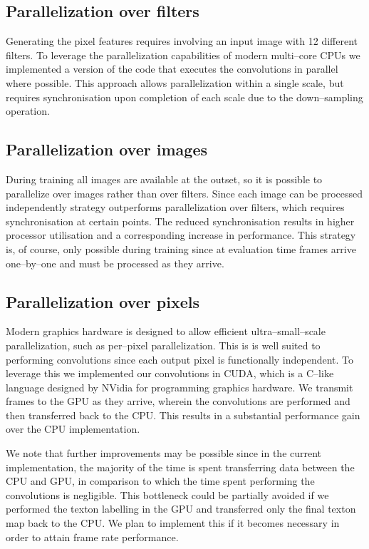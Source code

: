 \subsection{Parallelization over filters}
Generating the pixel features requires involving an input image with
12 different filters. To leverage the parallelization capabilities of
modern multi--core CPUs we implemented a version of the code that
executes the convolutions in parallel where possible. This approach
allows parallelization within a single scale, but requires
synchronisation upon completion of each scale due to the
down--sampling operation.

\subsection{Parallelization over images}
During training all images are available at the outset, so it is
possible to parallelize over images rather than over filters. Since
each image can be processed independently strategy outperforms
parallelization over filters, which requires synchronisation at
certain points. The reduced synchronisation results in higher
processor utilisation and a corresponding increase in performance.
This strategy is, of course, only possible during training since at
evaluation time frames arrive one--by--one and must be processed as
they arrive.

\subsection{Parallelization over pixels}
Modern graphics hardware is designed to allow efficient
ultra--small--scale parallelization, such as per--pixel
parallelization. This is is well suited to performing convolutions
since each output pixel is functionally independent. To leverage this
we implemented our convolutions in CUDA, which is a C--like language
designed by NVidia for programming graphics hardware. We transmit
frames to the GPU as they arrive, wherein the convolutions are
performed and then transferred back to the CPU. This results in a
substantial performance gain over the CPU implementation.

We note that further improvements may be possible since in the current
implementation, the majority of the time is spent transferring data
between the CPU and GPU, in comparison to which the time spent
performing the convolutions is negligible. This bottleneck could be
partially avoided if we performed the texton labelling in the GPU and
transferred only the final texton map back to the CPU. We plan to
implement this if it becomes necessary in order to attain frame rate
performance.

